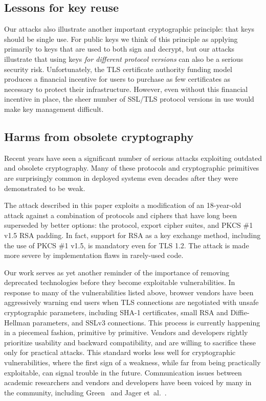 \subsection{Lessons for key reuse}

Our attacks also illustrate another important cryptographic principle: that keys should be single use.  For public keys we think of this principle as applying primarily to keys that are used to both sign and decrypt, but our attacks illustrate that using keys \emph{for different protocol versions} can also be a serious security risk.  Unfortunately, the TLS certificate authority funding model produces a financial incentive for users to purchase as few certificates as necessary to protect their infrastructure.  However, even without this financial incentive in place, the sheer number of SSL/TLS protocol versions in use would make key management difficult.

\subsection{Harms from obsolete cryptography}

Recent years have seen a significant number of serious attacks exploiting outdated and obsolete cryptography.  Many of these protocols and cryptographic primitives are surprisingly common in deployed systems even decades after they were demonstrated to be weak.



The attack described in this paper exploits a modification of an 18-year-old attack against a combination of protocols and ciphers that have long been superseded by better options: the \ssltwo protocol, export cipher suites, and PKCS \#1 v1.5 RSA padding.  In fact, support for RSA as a key exchange method, including the use of PKCS \#1 v1.5, is mandatory even for TLS 1.2. The attack is made more severe by implementation flaws in rarely-used code.

Our work serves as yet another reminder of the importance of removing deprecated technologies before they become exploitable vulnerabilities.  In response to many of the vulnerabilities listed above, browser vendors have been aggressively warning end users when TLS connections are negotiated with unsafe cryptographic parameters, including SHA-1 certificates, small RSA and Diffie-Hellman parameters, and SSLv3 connections.  This process is currently happening in a piecemeal fashion, primitive by primitive.  Vendors and developers rightly prioritize usability and backward compatibility, and are willing to sacrifice these only for practical attacks.  This standard works less well for cryptographic vulnerabilities, where the first sign of a weakness, while far from being practically exploitable, can signal trouble in the future.
Communication issues between academic researchers and vendors and developers have been voiced by many in the community, including Green~\cite{green2015secure} and Jager et~al.\@~\cite{jager2013one}.

